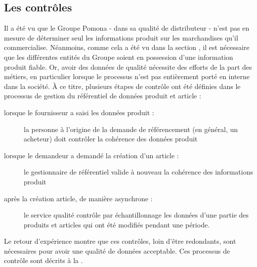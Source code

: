             \subsection{Les contrôles}

            Il a été vu que le Groupe Pomona - dans sa qualité de distributeur - n'est pas en mesure de déterminer seul les informations produit sur les marchandises qu'il commercialise.
            Néanmoins, comme cela a été vu dans la section , il est nécessaire que les différentes entités du Groupe soient en possession d'une information produit fiable.
            Or, avoir des données de qualité nécessite des efforts de la part des métiers, en particulier lorsque le processus n'est pas entièrement porté en interne dans la société.
            \`{A} ce titre, plusieurs étapes de contrôle ont été définies dans le processus de gestion du référentiel de données produit et article :
            \begin{description}
                \item[lorsque le fournisseur a saisi les données produit :] la personne à l'origine de la demande de référencement (en général, un acheteur) doit contrôler la cohérence des données produit
                \item[lorsque le demandeur a demandé la création d'un article :]  le gestionnaire de référentiel valide à nouveau la cohérence des informations produit
                \item[après la création article, de manière asynchrone :] le service qualité contrôle par échantillonnage les données d'une partie des produits et articles qui ont été modifiés pendant une période.
            \end{description}
            Le retour d'expérience montre que ces contrôles, loin d'être redondants, sont nécessaires pour avoir une qualité de données acceptable.
            Ces processus de contrôle sont décrits à la .

